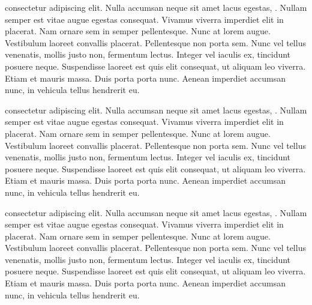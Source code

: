 \documentclass[12pt]{article}
\begin{document}
 consectetur adipiscing elit. Nulla accumsan neque sit amet lacus egestas, . Nullam semper est vitae augue egestas consequat. Vivamus viverra imperdiet elit in placerat. Nam ornare sem in semper pellentesque. Nunc at lorem augue. Vestibulum laoreet convallis placerat. Pellentesque non porta sem. Nunc vel tellus venenatis, mollis justo non, fermentum lectus. Integer vel iaculis ex, tincidunt posuere neque. Suspendisse laoreet est quis elit consequat, ut aliquam leo viverra. Etiam et mauris massa. Duis porta porta nunc. Aenean imperdiet accumsan nunc, in vehicula tellus hendrerit eu.

 consectetur adipiscing elit. Nulla accumsan neque sit amet lacus egestas, . Nullam semper est vitae augue egestas consequat. Vivamus viverra imperdiet elit in placerat. Nam ornare sem in semper pellentesque. Nunc at lorem augue. Vestibulum laoreet convallis placerat. Pellentesque non porta sem. Nunc vel tellus venenatis, mollis justo non, fermentum lectus. Integer vel iaculis ex, tincidunt posuere neque. Suspendisse laoreet est quis elit consequat, ut aliquam leo viverra. Etiam et mauris massa. Duis porta porta nunc. Aenean imperdiet accumsan nunc, in vehicula tellus hendrerit eu.

 consectetur adipiscing elit. Nulla accumsan neque sit amet lacus egestas, . Nullam semper est vitae augue egestas consequat. Vivamus viverra imperdiet elit in placerat. Nam ornare sem in semper pellentesque. Nunc at lorem augue. Vestibulum laoreet convallis placerat. Pellentesque non porta sem. Nunc vel tellus venenatis, mollis justo non, fermentum lectus. Integer vel iaculis ex, tincidunt posuere neque. Suspendisse laoreet est quis elit consequat, ut aliquam leo viverra. Etiam et mauris massa. Duis porta porta nunc. Aenean imperdiet accumsan nunc, in vehicula tellus hendrerit eu.
\end{document}
